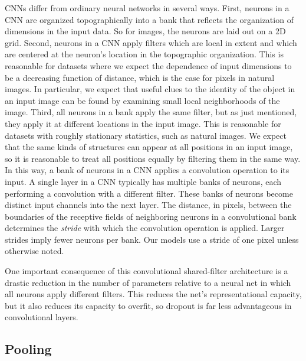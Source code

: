 \documentclass[12pt]{article}
\begin{document}
CNNs differ from ordinary neural networks in several ways. First,
neurons in a CNN are organized topographically into a bank that reflects
the organization of dimensions in the input data. So for images, the
neurons are laid out on a 2D grid. Second, neurons in a CNN apply
filters which are local in extent and which are centered at the neuron's
location in the topographic organization. This is reasonable for datasets
where we expect the dependence of input dimensions to be a decreasing
function of distance, which is the case for pixels in natural images.
In particular, we expect that useful clues to the identity of the
object in an input image can be found by examining small local neighborhoods
of the image. Third, all neurons in a bank apply the same filter,
but as just mentioned, they apply it at different locations in the
input image. This is reasonable for datasets with roughly stationary
statistics, such as natural images. We expect that the same kinds
of structures can appear at all positions in an input image, so it
is reasonable to treat all positions equally by filtering them in
the same way. In this way, a bank of neurons in a CNN applies a convolution
operation to its input. A single layer in a CNN typically has multiple
banks of neurons, each performing a convolution with a different filter.
These banks of neurons become distinct input channels into the next
layer. The distance, in pixels, between the boundaries of the receptive
fields of neighboring neurons in a convolutional bank determines the
\emph{stride} with which the convolution operation is applied. Larger
strides imply fewer neurons per bank. Our models use a stride of one
pixel unless otherwise noted.

One important consequence of this convolutional shared-filter architecture
is a drastic reduction in the number of parameters relative to a neural
net in which all neurons apply different filters. This reduces the
net's representational capacity, but it also reduces its capacity
to overfit, so dropout is far less advantageous in convolutional layers. 


\subsection{Pooling}
\end{document}
